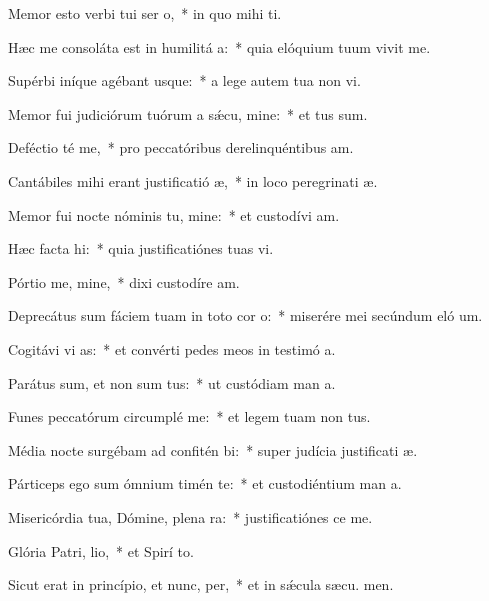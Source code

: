 \item Memor esto verbi tui ser o,~* in quo mihi  ti.
\item Hæc me consoláta est in humilitá a:~* quia elóquium tuum vivit me.
\item Supérbi iníque agébant usque:~* a lege autem tua non vi.
\item Memor fui judiciórum tuórum a sǽcu, mine:~* et tus sum.
\item Deféctio té me,~* pro peccatóribus derelinquéntibus  am.
\item Cantábiles mihi erant justificatió æ,~* in loco peregrinati æ.
\item Memor fui nocte nóminis tu, mine:~* et custodívi  am.
\item Hæc facta  hi:~* quia justificatiónes tuas vi.
\item Pórtio me, mine,~* dixi custodíre  am.
\item Deprecátus sum fáciem tuam in toto cor o:~* miserére mei secúndum eló um.
\item Cogitávi vi as:~* et convérti pedes meos in testimó a.
\item Parátus sum, et non sum tus:~* ut custódiam man a.
\item Funes peccatórum circumplé  me:~* et legem tuam non  tus.
\item Média nocte surgébam ad confitén bi:~* super judícia justificati æ.
\item Párticeps ego sum ómnium timén te:~* et custodiéntium man a.
\item Misericórdia tua, Dómine, plena  ra:~* justificatiónes  ce me.
\item Glória Patri,  lio,~* et Spirí to.
\item Sicut erat in princípio, et nunc,  per,~* et in sǽcula sæcu. men.
